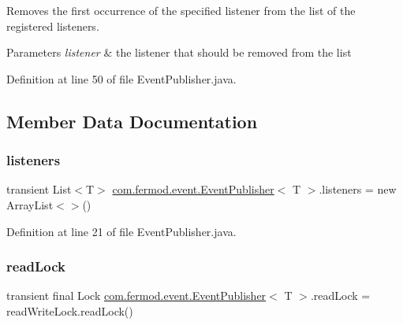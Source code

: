 Removes the first occurrence of the specified listener from the list of the registered listeners. 


\begin{DoxyParams}{Parameters}
{\em listener} & the listener that should be removed from the list \\
\hline
\end{DoxyParams}


Definition at line 50 of file Event\+Publisher.\+java.



\subsection{Member Data Documentation}
\mbox{\label{classcom_1_1fermod_1_1event_1_1EventPublisher_a5f009aca2ca381c03151e765f5f8378e}} 
\subsubsection{\texorpdfstring{listeners}{listeners}}
{\footnotesize\ttfamily transient List$<$T$>$ \mbox{\hyperlink{classcom_1_1fermod_1_1event_1_1EventPublisher}{com.\+fermod.\+event.\+Event\+Publisher}}$<$ T $>$.listeners = new Array\+List$<$$>$()\hspace{0.3cm}{\ttfamily [private]}}



Definition at line 21 of file Event\+Publisher.\+java.

\mbox{\label{classcom_1_1fermod_1_1event_1_1EventPublisher_a9a0e9bb2169464a95ff912172496008d}} 
\subsubsection{\texorpdfstring{readLock}{readLock}}
{\footnotesize\ttfamily transient final Lock \mbox{\hyperlink{classcom_1_1fermod_1_1event_1_1EventPublisher}{com.\+fermod.\+event.\+Event\+Publisher}}$<$ T $>$.read\+Lock = read\+Write\+Lock.\+read\+Lock()\hspace{0.3cm}{\ttfamily [protected]}}



